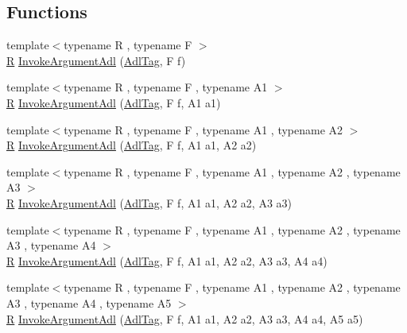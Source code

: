 \subsection*{Functions}
\begin{DoxyCompactItemize}
\item 
{\footnotesize template$<$typename R , typename F $>$ }\\\hyperlink{typedefs__9_8js_afb423b73ee7b6c04d2d54fc06e405404}{R} \hyperlink{namespacetesting_1_1internal_1_1invoke__argument_a003f0228357c54422037bd3b448b355a}{Invoke\+Argument\+Adl} (\hyperlink{structtesting_1_1internal_1_1invoke__argument_1_1_adl_tag}{Adl\+Tag}, F f)
\item 
{\footnotesize template$<$typename R , typename F , typename A1 $>$ }\\\hyperlink{typedefs__9_8js_afb423b73ee7b6c04d2d54fc06e405404}{R} \hyperlink{namespacetesting_1_1internal_1_1invoke__argument_af07db25fc1b7486fb991495863bf1ab8}{Invoke\+Argument\+Adl} (\hyperlink{structtesting_1_1internal_1_1invoke__argument_1_1_adl_tag}{Adl\+Tag}, F f, A1 a1)
\item 
{\footnotesize template$<$typename R , typename F , typename A1 , typename A2 $>$ }\\\hyperlink{typedefs__9_8js_afb423b73ee7b6c04d2d54fc06e405404}{R} \hyperlink{namespacetesting_1_1internal_1_1invoke__argument_afe4a6811c2bcd0c6c51194b95e224f73}{Invoke\+Argument\+Adl} (\hyperlink{structtesting_1_1internal_1_1invoke__argument_1_1_adl_tag}{Adl\+Tag}, F f, A1 a1, A2 a2)
\item 
{\footnotesize template$<$typename R , typename F , typename A1 , typename A2 , typename A3 $>$ }\\\hyperlink{typedefs__9_8js_afb423b73ee7b6c04d2d54fc06e405404}{R} \hyperlink{namespacetesting_1_1internal_1_1invoke__argument_ae5e7bcffcae6a29e9c66298ead5ee91b}{Invoke\+Argument\+Adl} (\hyperlink{structtesting_1_1internal_1_1invoke__argument_1_1_adl_tag}{Adl\+Tag}, F f, A1 a1, A2 a2, A3 a3)
\item 
{\footnotesize template$<$typename R , typename F , typename A1 , typename A2 , typename A3 , typename A4 $>$ }\\\hyperlink{typedefs__9_8js_afb423b73ee7b6c04d2d54fc06e405404}{R} \hyperlink{namespacetesting_1_1internal_1_1invoke__argument_aace931066a0efe189d7a0c69f06b74ec}{Invoke\+Argument\+Adl} (\hyperlink{structtesting_1_1internal_1_1invoke__argument_1_1_adl_tag}{Adl\+Tag}, F f, A1 a1, A2 a2, A3 a3, A4 a4)
\item 
{\footnotesize template$<$typename R , typename F , typename A1 , typename A2 , typename A3 , typename A4 , typename A5 $>$ }\\\hyperlink{typedefs__9_8js_afb423b73ee7b6c04d2d54fc06e405404}{R} \hyperlink{namespacetesting_1_1internal_1_1invoke__argument_a371c08ae03d150520e8bda58fb4574c3}{Invoke\+Argument\+Adl} (\hyperlink{structtesting_1_1internal_1_1invoke__argument_1_1_adl_tag}{Adl\+Tag}, F f, A1 a1, A2 a2, A3 a3, A4 a4, A5 a5)

\end{DoxyCompactItemize}
